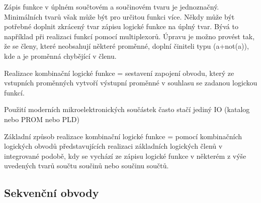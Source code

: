 Zápis funkce v úplném součtovém a součinovém tvaru je
jednoznačný. Minimálních tvarů však může být pro určitou funkci více.
Někdy může být potřebné doplnit zkrácený tvar zápisu logické funkce na
úplný tvar. Bývá to například při realizaci funkcí pomocí multiplexorů. Úpravu je možno
provést tak, že se členy, které neobsahují některé proměnné, doplní činiteli typu (a+not(a)), kde a je proměnná chybějící v členu.

Realizace kombinační logické funkce = sestavení zapojení
obvodu, který ze vstupních proměnných vytvoří výstupní
proměnné v souhlasu se zadanou logickou funkcí.

Použití moderních mikroelektronických součástek
často stačí jediný IO (katalog nebo PROM nebo PLD)

Základní způsob realizace kombinační logické funkce =
pomocí kombinačních logických obvodů představujících
realizaci základních logických členů v integrované podobě,
kdy se vychází ze zápisu logické funkce v některém z výše
uvedených tvarů součtu součinů nebo součinu součtů.

\subsection{Sekvenční obvody}
